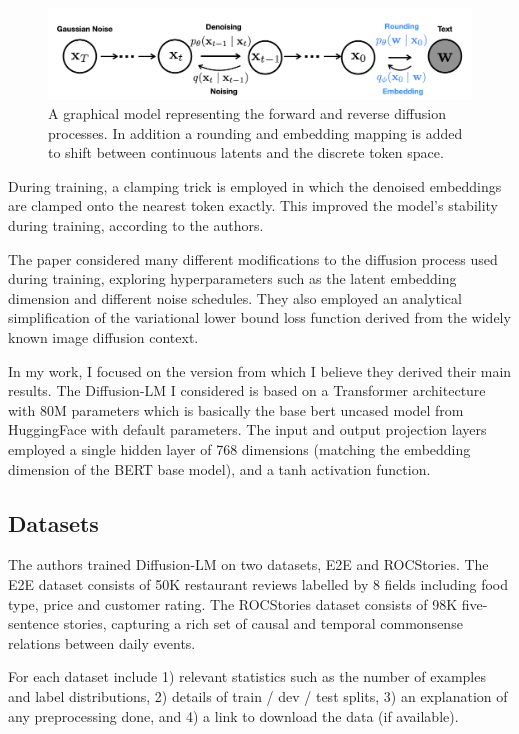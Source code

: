 \begin{figure}[h]
\includegraphics[scale=0.3]{images/diffusion-lm-graphical-model.png}
\centering
\caption{A graphical model representing the forward and reverse diffusion processes. In addition a rounding and embedding mapping is added to shift between continuous latents and the discrete token space.}
\label{fig:graphical-model}
\end{figure}

During training, a clamping trick is employed in which the denoised embeddings are clamped onto the nearest token exactly. This improved the model's stability during training, according to the authors.

The paper considered many different modifications to the diffusion process used during training, exploring hyperparameters such as the latent embedding dimension and different noise schedules. They also employed an analytical simplification of the variational lower bound loss function derived from the widely known image diffusion context.

In my work, I focused on the version from which I believe they derived their main results. The Diffusion-LM I considered is based on a Transformer architecture with 80M parameters which is basically the base bert uncased model from HuggingFace with default parameters. The input and output projection layers employed a single hidden layer of 768 dimensions (matching the embedding dimension of the BERT base model), and a tanh activation function.

\subsection{Datasets}

The authors trained Diffusion-LM on two datasets, E2E and ROCStories. The E2E dataset consists of 50K restaurant reviews labelled by 8 fields including food type, price and customer rating. The ROCStories dataset consists of 98K five-sentence stories, capturing a rich set of causal and temporal commonsense relations between daily events.



For each dataset include 1) relevant statistics such as the number of examples and label distributions, 2) details of train / dev / test splits, 3) an explanation of any preprocessing done, and 4) a link to download the data (if available).

